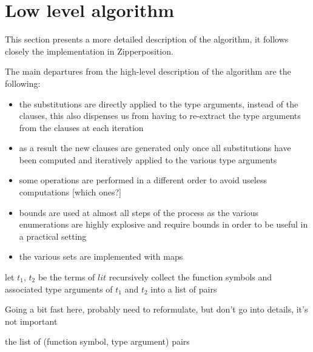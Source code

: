 \documentclass{article}
\begin{document}
\section{Low level algorithm}

This section presents a more detailed description of the algorithm, it follows closely the implementation in Zipperposition.

The main departures from the high-level description of the algorithm are the following:
\begin{itemize}
   \item the substitutions are directly applied to the type arguments, instead of the clauses, this also dispenses us from having to re-extract the type arguments from the clauses at each iteration
   \item as a result the new clauses are generated only once all substitutions have been computed and iteratively applied to the various type arguments
   \item some operations are performed in a different order to avoid useless computations [which ones?]
   \item bounds are used at almost all steps of the process as the various enumerations are highly explosive and require bounds in order to be useful in a practical setting
   \item the various sets are implemented with maps
\end{itemize}

\begin{algorithm}[tbh]
\begin{algorithmic}[1]

   \State let \(t_1\), \(t_2\) be the terms of \(lit\)
   \State recursively collect the function symbols and associated type arguments of \(t_1\) and \(t_2\) into a list of pairs

   \State \Comment Going a bit fast here, probably need to reformulate, but don't go into details, it's not important

   \State \Return the list of (function symbol, type argument) pairs

\EndFunction
\end{algorithmic}
\end{algorithm}
\end{document}
